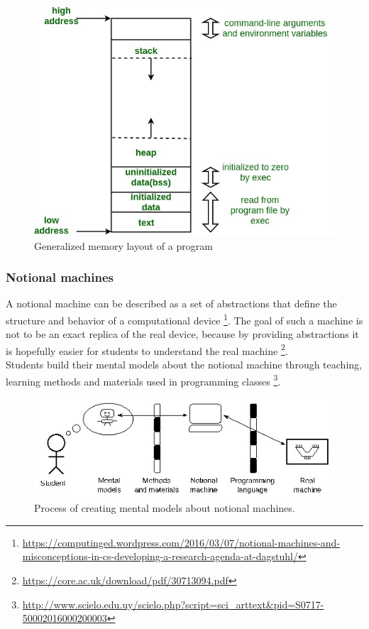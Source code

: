 \documentclass[]{usiinfbachelorproject}
\begin{document}
\begin{figure}[h!]
\includegraphics[scale=0.4]{figures/memory_layout.jpg}
\centering
\caption {Generalized memory layout of a program}
\end{figure}
 
\subsubsection{Notional machines}

A notional machine can be described as a set of abstractions that define the structure and behavior of a computational device \footnote{\url{https://computinged.wordpress.com/2016/03/07/notional-machines-and-misconceptions-in-cs-developing-a-research-agenda-at-dagstuhl/}}. The goal of such a machine is not to be an exact replica of the real device, because by providing abstractions it is hopefully easier for students to understand the real machine \footnote{\url{https://core.ac.uk/download/pdf/30713094.pdf}}.\\
\noindent Students build their mental models about the notional machine through teaching, learning methods and materials used in programming classes \footnote{\url{http://www.scielo.edu.uy/scielo.php?script=sci_arttext&pid=S0717-50002016000200003}}.
 
\begin{figure}[h!]
\includegraphics[scale=0.8]{figures/notional_machine.jpg}
\centering
\caption {Process of creating mental models about notional machines.}
\end{figure}
 
\end{document}
